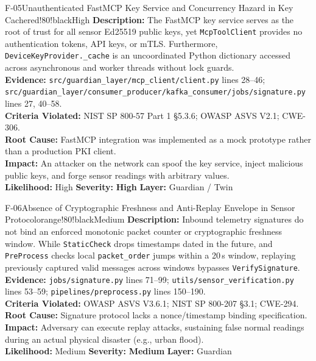 \documentclass[10pt,a4paper]{report}
\begin{document}
\begin{findingbox}{F-05}{Unauthenticated FastMCP Key Service and Concurrency Hazard in Key Cache}{red!80!black}{High}
\textbf{Description:} The FastMCP key service serves as the root of trust for all sensor Ed25519 public keys, yet \texttt{McpToolClient} provides no authentication tokens, API keys, or mTLS. Furthermore, \texttt{DeviceKeyProvider.\_cache} is an uncoordinated Python dictionary accessed across asynchronous and worker threads without lock guards.\\
\textbf{Evidence:} \texttt{src/guardian\_layer/mcp\_client/client.py} lines 28--46; \texttt{src/guardian\_layer/consumer\_producer/kafka\_consumer/jobs/signature.py} lines 27, 40--58.\\
\textbf{Criteria Violated:} NIST SP 800-57 Part 1 §5.3.6; OWASP ASVS V2.1; CWE-306.\\
\textbf{Root Cause:} FastMCP integration was implemented as a mock prototype rather than a production PKI client.\\
\textbf{Impact:} An attacker on the network can spoof the key service, inject malicious public keys, and forge sensor readings with arbitrary values.\\
\textbf{Likelihood:} High \quad \textbar \quad \textbf{Severity:} \textbf{High} \quad \textbar \quad \textbf{Layer:} Guardian / Twin
\end{findingbox}

\begin{findingbox}{F-06}{Absence of Cryptographic Freshness and Anti-Replay Envelope in Sensor Protocol}{orange!80!black}{Medium}
\textbf{Description:} Inbound telemetry signatures do not bind an enforced monotonic packet counter or cryptographic freshness window. While \texttt{StaticCheck} drops timestamps dated in the future, and \texttt{PreProcess} checks local \texttt{packet\_order} jumps within a 20\,s window, replaying previously captured valid messages across windows bypasses \texttt{VerifySignature}.\\
\textbf{Evidence:} \texttt{jobs/signature.py} lines 71--99; \texttt{utils/sensor\_verification.py} lines 53--59; \texttt{pipelines/preprocess.py} lines 150--190.\\
\textbf{Criteria Violated:} OWASP ASVS V3.6.1; NIST SP 800-207 §3.1; CWE-294.\\
\textbf{Root Cause:} Signature protocol lacks a nonce/timestamp binding specification.\\
\textbf{Impact:} Adversary can execute replay attacks, sustaining false normal readings during an actual physical disaster (e.g., urban flood).\\
\textbf{Likelihood:} Medium \quad \textbar \quad \textbf{Severity:} \textbf{Medium} \quad \textbar \quad \textbf{Layer:} Guardian
\end{findingbox}
\end{document}
